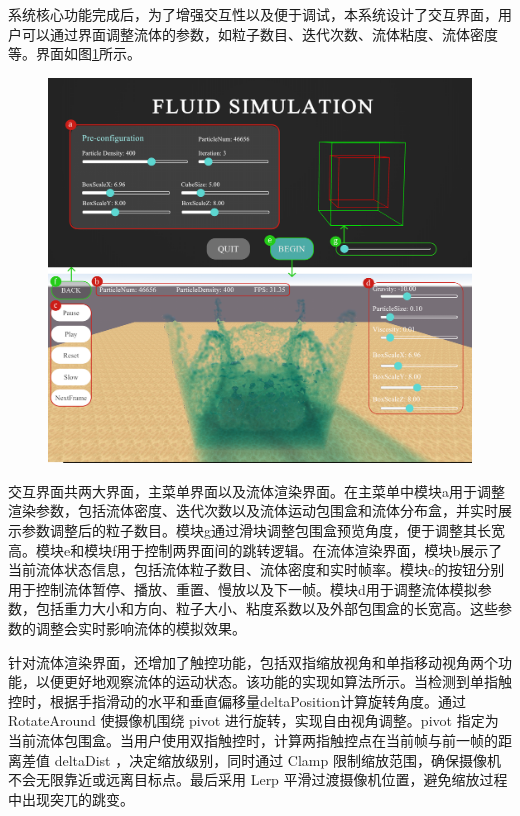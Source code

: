 系统核心功能完成后，为了增强交互性以及便于调试，本系统设计了交互界面，用户可以通过界面调整流体的参数，如粒子数目、迭代次数、流体粘度、流体密度等。界面如图\ref{fig:ui}所示。

\begin{figure}[h]
    \centering
    \includegraphics[width=0.9\linewidth]{image/UIlook.png}
    \label{fig:ui}
\end{figure}

交互界面共两大界面，主菜单界面以及流体渲染界面。在主菜单中模块a用于调整渲染参数，包括流体密度、迭代次数以及流体运动包围盒和流体分布盒，并实时展示参数调整后的粒子数目。模块g通过滑块调整包围盒预览角度，便于调整其长宽高。模块e和模块f用于控制两界面间的跳转逻辑。在流体渲染界面，模块b展示了当前流体状态信息，包括流体粒子数目、流体密度和实时帧率。模块c的按钮分别用于控制流体暂停、播放、重置、慢放以及下一帧。模块d用于调整流体模拟参数，包括重力大小和方向、粒子大小、粘度系数以及外部包围盒的长宽高。这些参数的调整会实时影响流体的模拟效果。

针对流体渲染界面，还增加了触控功能，包括双指缩放视角和单指移动视角两个功能，以便更好地观察流体的运动状态。该功能的实现如算法\label{alg:touchEvent}所示。当检测到单指触控时，根据手指滑动的水平和垂直偏移量deltaPosition计算旋转角度。通过 RotateAround 使摄像机围绕 pivot 进行旋转，实现自由视角调整。pivot 指定为当前流体包围盒。当用户使用双指触控时，计算两指触控点在当前帧与前一帧的距离差值 deltaDist ，决定缩放级别，同时通过 Clamp 限制缩放范围，确保摄像机不会无限靠近或远离目标点。最后采用 Lerp 平滑过渡摄像机位置，避免缩放过程中出现突兀的跳变。

